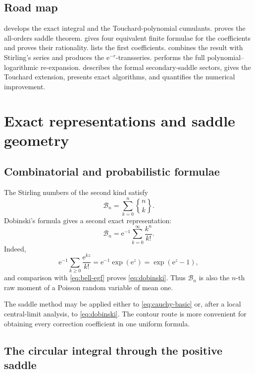 \documentclass[11pt,a4paper]{article}
\theoremstyle{definition}
\theoremstyle{remark}
\newcommand{\Bell}{\mathcal B}
\newcommand{\ee}{\mathrm e}
\newcommand{\Stwo}[2]{\genfrac\{\}{0pt}{}{#1}{#2}}
\begin{document}
\subsection{Road map}

 develops the exact integral and the Touchard-polynomial
cumulants.   proves the all-orders saddle theorem.
 gives four equivalent finite formulae for the coefficients
and proves their rationality.   lists the first coefficients.
 combines the result with Stirling's series and produces the
\(\ee^{-r}\)-transseries.   performs the full
polynomial--logarithmic re-expansion.   describes the formal
secondary-saddle sectors,  gives the Touchard extension,
 presents exact algorithms, and 
quantifies the numerical improvement.

\section{Exact representations and saddle geometry}\label{sec:exact}

\subsection{Combinatorial and probabilistic formulae}

The Stirling numbers of the second kind satisfy
\[
  \Bell_n=\sum_{k=0}^n\Stwo{n}{k}.
\]
Dobinski's formula gives a second exact representation:
\begin{equation}\label{eq:dobinski}
  \Bell_n=\ee^{-1}\sum_{k=0}^{\infty}\frac{k^n}{k!}.
\end{equation}
Indeed,
\[
 \ee^{-1}\sum_{k\ge0}\frac{\ee^{kz}}{k!}
 =\ee^{-1}\exp(\ee^z)=\exp(\ee^z-1),
\]
and comparison with \cref{eq:bell-egf} proves \cref{eq:dobinski}.  Thus
\(\Bell_n\) is also the \(n\)-th raw moment of a Poisson random variable of
mean one.

The saddle method may be applied either to \cref{eq:cauchy-basic} or, after a
local central-limit analysis, to \cref{eq:dobinski}.  The contour route is more
convenient for obtaining every correction coefficient in one uniform formula.

\subsection{The circular integral through the positive saddle}
\end{document}
